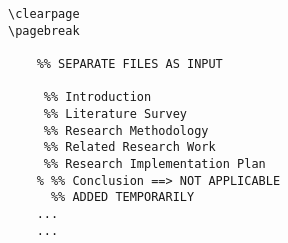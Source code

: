 \begin{tcolorbox}
\begin{lstlisting}[caption={zzAdvice-on-Appendices}, label=zzAdvice-on-Appendices]
\clearpage
\pagebreak
	
	%% SEPARATE FILES AS INPUT
	
	 %% Introduction
	 %% Literature Survey
	 %% Research Methodology
	 %% Related Research Work
	 %% Research Implementation Plan
	% %% Conclusion ==> NOT APPLICABLE
	  %% ADDED TEMPORARILY
	...
	...
\end{lstlisting}
\end{tcolorbox}
